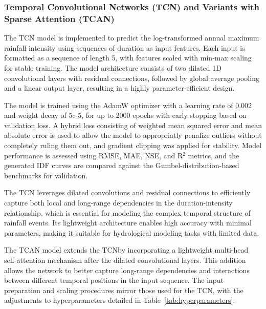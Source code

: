 \subsubsection{Temporal Convolutional Networks (TCN) and Variants with Sparse Attention (TCAN)}

The TCN model is implemented to predict the log-transformed annual maximum rainfall intensity using sequences of duration as input features. Each input is formatted as a sequence of length 5, with features scaled with min-max scaling for stable training. The model architecture consists of two dilated 1D convolutional layers with residual connections, followed by global average pooling and a linear output layer, resulting in a highly parameter-efficient design.

\vspace{1em}

The model is trained using the AdamW optimizer with a learning rate of 0.002 and weight decay of 5e-5, for up to 2000 epochs with early stopping based on validation loss. A hybrid loss consisting of weighted mean squared error and mean absolute error is used to allow the model to appropriatly penalize outliers without completely ruling them out, and gradient clipping was applied for stability. Model performance is assessed using RMSE, MAE, NSE, and R$^{2}$ metrics, and the generated IDF curves are compared against the Gumbel-distribution-based benchmarks for validation.

\vspace{1em}

The TCN leverages dilated convolutions and residual connections to efficiently capture both local and long-range dependencies in the duration-intensity relationship, which is essential for modeling the complex temporal structure of rainfall events. Its lightweight architecture enables high accuracy with minimal parameters, making it suitable for hydrological modeling tasks with limited data.

\vspace{1em}

The TCAN model extends the TCN\@ by incorporating a lightweight multi-head self-attention mechanism after the dilated convolutional layers. This addition allows the network to better capture long-range dependencies and interactions between different temporal positions in the input sequence. The input preparation and scaling procedures mirror those used for the TCN\@, with the adjustments to hyperparameters detailed in Table~\ref{tab:hyperparameters}.

